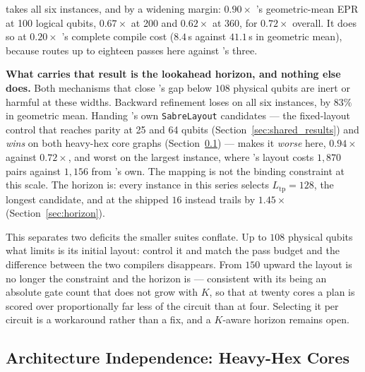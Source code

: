 \PORTER{} takes all six instances, and by a widening margin: $0.90\times$
\dSABRE{}'s geometric-mean EPR at 100 logical qubits, $0.67\times$ at 200
and $0.62\times$ at 360, for $0.72\times$ overall. It does so at
$0.20\times$ \dSABRE{}'s complete compile cost ($8.4$\,s against
$41.1$\,s in geometric mean), because \dSABRE{} routes up to eighteen
passes here against \PORTER{}'s three.

\textbf{What carries that result is the lookahead horizon, and nothing
else does.} Both mechanisms that close \PORTER{}'s gap below $108$
physical qubits are inert or harmful at these widths. Backward
refinement loses on all six instances, by $83\%$ in geometric mean.
Handing \PORTER{} \dSABRE{}'s own \texttt{SabreLayout} candidates ---
the fixed-layout control that reaches parity at 25 and 64 qubits
(Section~\ref{sec:shared_results}) and \emph{wins} on both heavy-hex
core graphs (Section~\ref{sec:heavyhex}) --- makes it \emph{worse} here,
$0.94\times$ against $0.72\times$, and worst on the largest instance,
where \dSABRE{}'s layout costs $1{,}870$ pairs against $1{,}156$ from
\PORTER{}'s own. The mapping is not the binding constraint at this
scale. The horizon is: every instance in this series selects
$L_\mathrm{tp}{=}128$, the longest candidate, and at the shipped $16$
\PORTER{} instead trails \dSABRE{} by $1.45\times$
(Section~\ref{sec:horizon}).

This separates two deficits the smaller suites conflate. Up to $108$
physical qubits what limits \PORTER{} is its initial layout: control it
and match the pass budget and the difference between the two compilers
disappears. From $150$ upward the layout is no longer the constraint and
the horizon is --- consistent with its being an absolute gate count that
does not grow with $K$, so that at twenty cores a plan is scored over
proportionally far less of the circuit than at four. Selecting it per
circuit is a workaround rather than a fix, and a $K$-aware horizon
remains open.

\subsection{Architecture Independence: Heavy-Hex Cores}
\label{sec:heavyhex}

